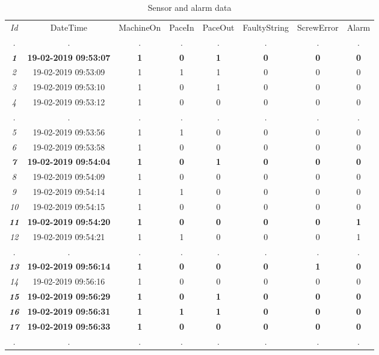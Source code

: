 \documentclass[runningheads]{llncs}
\begin{document}
\begin{table*}[ht]
\caption{Sensor and alarm data \cite{nadeem}}
\label{example}
\centering
\begin{tabular}{c|ccccccc}
\hline\noalign{\smallskip}
\emph{Id} & DateTime & MachineOn & PaceIn & PaceOut &  FaultyString  & ScrewError & Alarm\\
\noalign{\smallskip}
\hline
\noalign{\smallskip}
\emph{.} & . & . & . & . & . & . & . \\
\textbf{\emph{1}} & \textbf{19-02-2019 09:53:07}  & \textbf{1} & \textbf{0} & \textbf{1} &  \textbf{0} & \textbf{0} & \textbf{0}\\
\emph{2} & 19-02-2019 09:53:09  & 1 & 1 & 1 &  0 & 0 & 0\\
\emph{3} & 19-02-2019 09:53:10  & 1 & 0 & 1 &  0 & 0 & 0\\
\emph{4} & 19-02-2019 09:53:12  & 1 & 0 & 0 &  0 & 0 & 0\\
\emph{.} & . & . & . & . & . & . & . \\
\emph{5} & 19-02-2019 09:53:56  & 1 & 1 & 0 &  0 & 0 & 0\\
\emph{6} & 19-02-2019 09:53:58  & 1 & 0 & 0 &  0 & 0 & 0\\
\textbf{\emph{7}} & \textbf{19-02-2019 09:54:04}  & \textbf{1} & \textbf{0} & \textbf{1} &  \textbf{0} & \textbf{0} & \textbf{0}\\
\emph{8} & 19-02-2019 09:54:09  & 1 & 0 & 0 &  0 & 0 & 0\\
\emph{9} & 19-02-2019 09:54:14  & 1 & 1 & 0 &  0 & 0 & 0\\
\emph{10} & 19-02-2019 09:54:15  & 1 & 0 & 0 &  0 & 0 & 0\\
\textbf{\emph{11}} & \textbf{19-02-2019 09:54:20}  & \textbf{1} & \textbf{0} & \textbf{0} &  \textbf{0} & \textbf{0} & \textbf{1}\\
\emph{12}& 19-02-2019 09:54:21  & 1 & 1 & 0 &  0 & 0 & 1\\
\emph{.} & . & . & . & . & . & . & . \\
\textbf{\emph{13}} & \textbf{19-02-2019 09:56:14}  & \textbf{1} & \textbf{0} & \textbf{0} &  \textbf{0} & \textbf{1} & \textbf{0}\\
\emph{14} & 19-02-2019 09:56:16  & 1 & 0 & 0 &  0 & 0 & 0\\
\textbf{\emph{15}} & \textbf{19-02-2019 09:56:29}  & \textbf{1} & \textbf{0} & \textbf{1} &  \textbf{0} & \textbf{0} & \textbf{0}\\
\textbf{\emph{16}} & \textbf{19-02-2019 09:56:31}  & \textbf{1} & \textbf{1} & \textbf{1} &  \textbf{0} & \textbf{0} & \textbf{0}\\
\textbf{\emph{17}} & \textbf{19-02-2019 09:56:33}  & \textbf{1} & \textbf{0} & \textbf{0} &  \textbf{0} & \textbf{0} & \textbf{0}\\
\emph{.} & . & . & . & . &  . & . & . \\
\hline
\end{tabular}
\end{table*}
\end{document}
